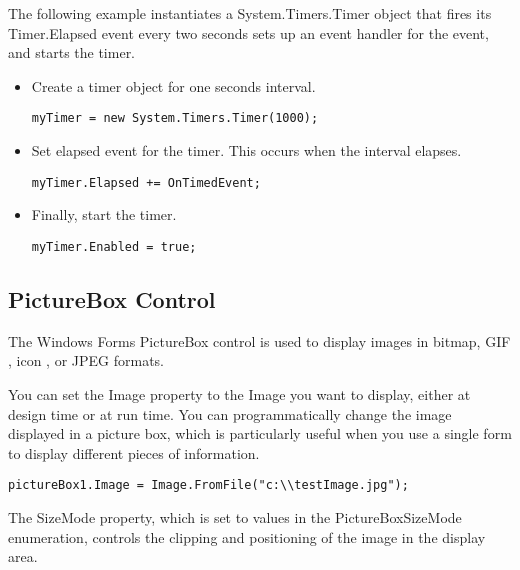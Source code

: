 The following example instantiates a System.Timers.Timer object that fires its Timer.Elapsed event every two seconds sets up an event handler for the event, and starts the timer.

\begin{itemize}
\item Create a timer object for one seconds interval.
\begin{lstlisting}[numbers=none]
 myTimer = new System.Timers.Timer(1000);
\end{lstlisting}
	
\item Set elapsed event for the timer. This occurs when the interval elapses.
\begin{lstlisting}[numbers=none]
myTimer.Elapsed += OnTimedEvent;
\end{lstlisting}

\item Finally, start the timer.
\begin{lstlisting}[numbers=none]
 myTimer.Enabled = true;
\end{lstlisting}
\end{itemize}

\subsection{PictureBox Control}
The Windows Forms PictureBox control is used to display images in bitmap, GIF , icon , or JPEG formats.


You can set the Image property to the Image you want to display, either at design time or at run time. You can programmatically change the image displayed in a picture box, which is particularly useful when you use a single form to display different pieces of information.

\begin{lstlisting}[numbers=none]
pictureBox1.Image = Image.FromFile("c:\\testImage.jpg");
\end{lstlisting}

The SizeMode property, which is set to values in the PictureBoxSizeMode enumeration, controls the clipping and positioning of the image in the display area.

